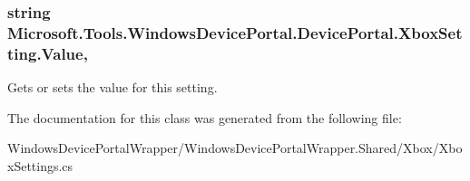 \subsubsection[{\texorpdfstring{Value}{Value}}]{\setlength{\rightskip}{0pt plus 5cm}string Microsoft.\+Tools.\+Windows\+Device\+Portal.\+Device\+Portal.\+Xbox\+Setting.\+Value\hspace{0.3cm}{\ttfamily [get]}, {\ttfamily [set]}}\hypertarget{class_microsoft_1_1_tools_1_1_windows_device_portal_1_1_device_portal_1_1_xbox_setting_a0beb396762460a97d9e84499c6d98ea0}{}\label{class_microsoft_1_1_tools_1_1_windows_device_portal_1_1_device_portal_1_1_xbox_setting_a0beb396762460a97d9e84499c6d98ea0}


Gets or sets the value for this setting. 



The documentation for this class was generated from the following file\+:\begin{DoxyCompactItemize}
\item 
Windows\+Device\+Portal\+Wrapper/\+Windows\+Device\+Portal\+Wrapper.\+Shared/\+Xbox/Xbox\+Settings.\+cs\end{DoxyCompactItemize}
